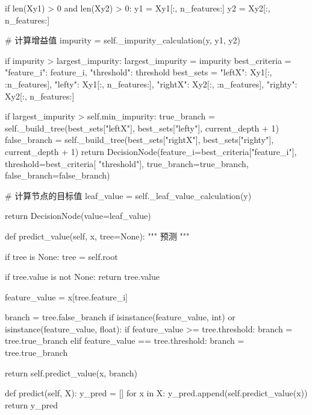 \documentclass[UTF8,a4paper,10pt]{ctexart}
\begin{document}
\begin{python}
                    if len(Xy1) > 0 and len(Xy2) > 0:
                        y1 = Xy1[:, n_features:]
                        y2 = Xy2[:, n_features:]

                        # 计算增益值
                        impurity = self._impurity_calculation(y, y1, y2)

                        if impurity > largest_impurity:
                            largest_impurity = impurity
                            best_criteria = {"feature_i": feature_i, "threshold": threshold}
                            best_sets = {
                                "leftX": Xy1[:, :n_features],
                                "lefty": Xy1[:, n_features:],
                                "rightX": Xy2[:, :n_features],
                                "righty": Xy2[:, n_features:]
                            }

        if largest_impurity > self.min_impurity:
            true_branch = self._build_tree(best_sets["leftX"], best_sets["lefty"], current_depth + 1)
            false_branch = self._build_tree(best_sets["rightX"], best_sets["righty"], current_depth + 1)
            return DecisionNode(feature_i=best_criteria["feature_i"], threshold=best_criteria[
                "threshold"], true_branch=true_branch, false_branch=false_branch)

        # 计算节点的目标值
        leaf_value = self._leaf_value_calculation(y)

        return DecisionNode(value=leaf_value)


    def predict_value(self, x, tree=None):
        """
        预测
        """

        if tree is None:
            tree = self.root

        if tree.value is not None:
            return tree.value

        feature_value = x[tree.feature_i]

        branch = tree.false_branch
        if isinstance(feature_value, int) or isinstance(feature_value, float):
            if feature_value >= tree.threshold:
                branch = tree.true_branch
        elif feature_value == tree.threshold:
            branch = tree.true_branch

        return self.predict_value(x, branch)

    def predict(self, X):
        y_pred = []
        for x in X:
            y_pred.append(self.predict_value(x))
        return y_pred
\end{python}
\end{document}
